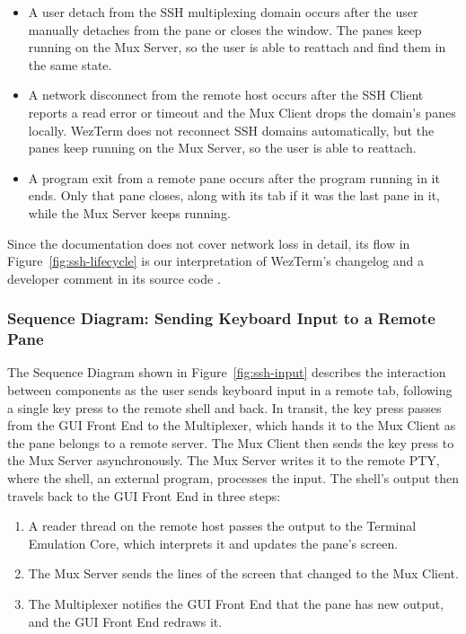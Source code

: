 \begin{itemize}
  \item A user detach from the SSH multiplexing domain occurs after the user manually detaches from the pane or closes the window. The panes keep running on the Mux Server, so the user is able to reattach and find them in the same state.
  \item A network disconnect from the remote host occurs after the SSH Client reports a read error or timeout and the Mux Client drops the domain's panes locally. WezTerm does not reconnect SSH domains automatically, but the panes keep running on the Mux Server, so the user is able to reattach.
  \item A program exit from a remote pane occurs after the program running in it ends. Only that pane closes, along with its tab if it was the last pane in it, while the Mux Server keeps running.
\end{itemize}

Since the documentation does not cover network loss in detail, its flow in Figure~\ref{fig:ssh-lifecycle} is our interpretation of WezTerm's changelog and a developer comment in its source code \cite{client-source}.


\clearpage

\subsubsection{Sequence Diagram: Sending Keyboard Input to a Remote Pane}
\label{sec:ssh-input}

The Sequence Diagram shown in Figure~\ref{fig:ssh-input} describes the interaction between components as the user sends keyboard input in a remote tab, following a single key press to the remote shell and back. In transit, the key press passes from the GUI Front End to the Multiplexer, which hands it to the Mux Client as the pane belongs to a remote server. The Mux Client then sends the key press to the Mux Server asynchronously. The Mux Server writes it to the remote PTY, where the shell, an external program, processes the input. The shell's output then travels back to the GUI Front End in three steps:

\begin{enumerate}
  \item A reader thread on the remote host passes the output to the Terminal Emulation Core, which interprets it and updates the pane's screen.
  \item The Mux Server sends the lines of the screen that changed to the Mux Client.
  \item The Multiplexer notifies the GUI Front End that the pane has new output, and the GUI Front End redraws it.
\end{enumerate}

